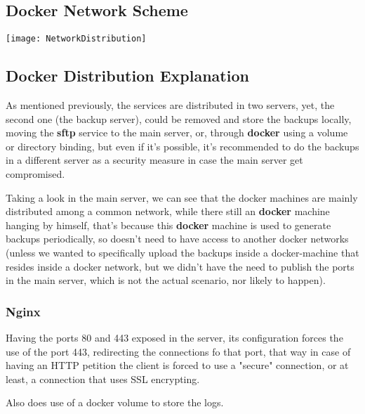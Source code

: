     \subsection{Docker Network Scheme}\label{subsec:ProjectNetworkScheme}
    \begin{center}
    \texttt{[image: NetworkDistribution]}
    \end{center}
    \newpage

    \subsection{Docker Distribution Explanation}\label{subsec:dockernetworkexplanation}
    \begin{flushleft}
        As mentioned previously, the services are distributed in two servers, yet, the second one (the backup server),
        could be removed and store the backups locally, moving the \textbf{sftp} service to the main server, or, through
        \textbf{docker} using a volume or directory binding, but even if it's possible, it's recommended to do the backups in a
        different server as a security measure in case the main server get compromised.
    \end{flushleft}

    \begin{flushleft}
        Taking a look in the main server, we can see that the docker machines are mainly distributed among a common network,
        while there still an \textbf{docker} machine hanging by himself, that's because this \textbf{docker} machine is
        used to generate backups periodically, so doesn't need to have access to another docker networks (unless we wanted to specifically upload
        the backups inside a docker-machine that resides inside a docker network, but we didn't have the need
        to publish the ports in the main server, which is not the actual scenario, nor likely to happen).
    \end{flushleft}


    \subsubsection[Nginx]{Nginx}
    \begin{flushleft}
        Having the ports 80 and 443 exposed in the server, its configuration forces the use of the port 443, redirecting
        the connections fo that port, that way in case of having an HTTP petition the client is forced to use a "secure"
        connection, or at least, a connection that uses SSL encrypting.
    \end{flushleft}
    \begin{flushleft}
        Also does use of a docker volume to store the logs.
    \end{flushleft}

